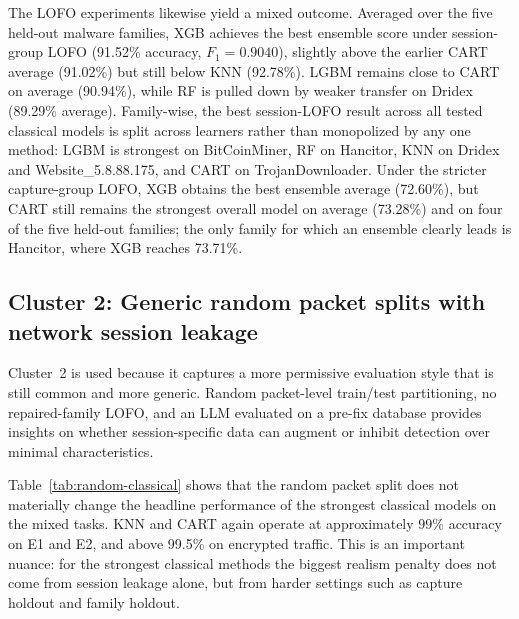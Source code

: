 \documentclass[conference]{IEEEtran}
\begin{document}
The LOFO experiments likewise yield a mixed outcome. Averaged over the five held-out malware families, XGB achieves the best ensemble score under session-group LOFO (91.52\% accuracy, $F_1=0.9040$), slightly above the earlier CART average (91.02\%) but still below KNN (92.78\%). LGBM remains close to CART on average (90.94\%), while RF is pulled down by weaker transfer on Dridex (89.29\% average). Family-wise, the best session-LOFO result across all tested classical models is split across learners rather than monopolized by any one method: LGBM is strongest on BitCoinMiner, RF on Hancitor, KNN on Dridex and Website\_5.8.88.175, and CART on TrojanDownloader. Under the stricter capture-group LOFO, XGB obtains the best ensemble average (72.60\%), but CART still remains the strongest overall model on average (73.28\%) and on four of the five held-out families; the only family for which an ensemble clearly leads is Hancitor, where XGB reaches 73.71\%.



\subsection{Cluster 2: Generic random packet splits with network session leakage}

Cluster~2 is used because it captures a more permissive evaluation style that is still common and more generic. Random packet-level train/test partitioning, no repaired-family LOFO, and an LLM evaluated on a pre-fix database provides insights on whether session-specific data can augment or inhibit detection over minimal characteristics. 

Table~\ref{tab:random-classical} shows that the random packet split does not materially change the headline performance of the strongest classical models on the mixed tasks. KNN and CART again operate at approximately 99\% accuracy on E1 and E2, and above 99.5\% on encrypted traffic. This is an important nuance: for the strongest classical methods the biggest realism penalty does not come from session leakage alone, but from harder settings such as capture holdout and family holdout.
\end{document}
